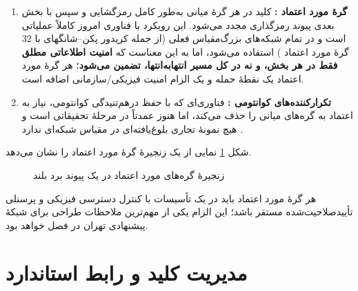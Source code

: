 \begin{enumerate}
\item \textbf{گرهٔ مورد اعتماد :} کلید در هر گرهٔ میانی به‌طور کامل رمزگشایی و سپس با بخش بعدی پیوند رمزگذاری مجدد می‌شود. این رویکرد با فناوری امروز کاملاً عملیاتی است و در تمام شبکه‌های بزرگ‌مقیاس فعلی (از جمله کریدور پکن--شانگهای با $32$ گرهٔ مورد اعتماد \Cite{jrc2019qkd}) استفاده می‌شود، اما به این معناست که \textbf{امنیت اطلاعاتی مطلق فقط در هر بخش، و نه در کل مسیر انتها‌به‌انتها، تضمین می‌شود}؛ هر گرهٔ مورد اعتماد یک نقطهٔ حمله و یک الزام امنیت فیزیکی/سازمانی اضافه است.
\item \textbf{تکرارکننده‌های کوانتومی :} فناوری‌ای که با حفظ درهم‌تنیدگی کوانتومی، نیاز به اعتماد به گره‌های میانی را حذف می‌کند، اما هنوز عمدتاً در مرحلهٔ تحقیقاتی است و هیچ نمونهٔ تجاری بلوغ‌یافته‌ای در مقیاس شبکه‌ای ندارد \Cite{npjqi2016}.
\end{enumerate}

شکل \ref{fig:trustednode} نمایی از یک زنجیرهٔ گرهٔ مورد اعتماد را نشان می‌دهد.

\begin{figure}[htbp]
\centering
{}
\caption{زنجیرهٔ گره‌های مورد اعتماد در یک پیوند  برد بلند}
\label{fig:trustednode}
\end{figure}

هر گرهٔ مورد اعتماد باید در یک تأسیسات با کنترل دسترسی فیزیکی و پرسنلی تأییدصلاحیت‌شده مستقر باشد؛ این الزام یکی از مهم‌ترین ملاحظات طراحی برای شبکهٔ پیشنهادی تهران در فصل  خواهد بود.

\section{مدیریت کلید و رابط استاندارد }

